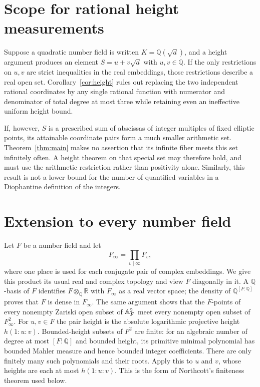\documentclass[11pt]{article}
\theoremstyle{remark}\newtheorem{remark}[theorem]{Remark}
\newcommand{\Q}{\mathbb Q}\newcommand{\R}{\mathbb R}
\begin{document}
\section{Scope for rational height measurements}
Suppose a quadratic number field is written
$K=\Q(\sqrt d)$, and a height argument produces an element
$S=u+v\sqrt d$ with $u,v\in\Q$.  If the only restrictions on $u,v$
are strict inequalities in the real embeddings, those restrictions
describe a real open set.  Corollary~\ref{cor:height} rules out replacing
the two independent rational coordinates by any single rational
function with numerator and denominator of total degree at most three
while retaining even an ineffective uniform height bound.

If, however, $S$ is a prescribed sum of abscissas of integer multiples
of fixed elliptic points, its attainable coordinate pairs form a much
smaller arithmetic set.  Theorem~\ref{thm:main} makes no assertion that
its infinite fiber meets this set infinitely often.  A height theorem
on that special set may therefore hold, and must use the arithmetic
restriction rather than positivity alone.  Similarly, this result is
not a lower bound for the number of quantified variables in a
Diophantine definition of the integers.

\section{Extension to every number field}
Let $F$ be a number field and let
\[
F_\infty=\prod_{v\mid\infty}F_v,
\]
where one place is used for each conjugate pair of complex embeddings.
We give this product its usual real and complex topology and view $F$
diagonally in it.  A $\Q$-basis of $F$ identifies
$F\otimes_\Q\R$ with $F_\infty$ as a real vector space; the density of
$\Q^{[F:\Q]}$ proves that $F$ is dense in $F_\infty$.
The same argument shows that the $F$-points of every nonempty Zariski
open subset of $\mathbb A_F^2$ meet every nonempty open subset of
$F_\infty^2$.
For $u,v\in F$ the pair height is the absolute logarithmic projective
height $h(1:u:v)$.  Bounded-height subsets of $F^2$ are finite: for an
algebraic number of degree at most $[F:\Q]$ and bounded height, its
primitive minimal polynomial has bounded Mahler measure and hence
bounded integer coefficients.  There are only finitely many such
polynomials and their roots.  Apply this to $u$ and $v$, whose heights
are each at most $h(1:u:v)$.  This is the form of Northcott's
finiteness theorem used below.
\end{document}
